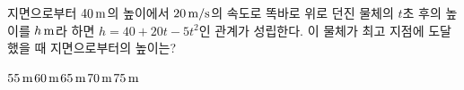 지면으로부터 $40\mkern3mu \mathrm{m}$의 높이에서 $20\mkern3mu \mathrm{m/s}$의 속도로 똑바로 위로 던진 물체의 $t$초 후의 높이를 $h\mkern3mu \mathrm{m}$라 하면 $h=40+20t-5t^2$인 관계가 성립한다. 이 물체가 최고 지점에 도달했을 때 지면으로부터의 높이는?
\begin{choices32}{$55\mkern3mu \mathrm{m}$}{$60\mkern3mu \mathrm{m}$}{$65\mkern3mu \mathrm{m}$}{$70\mkern3mu \mathrm{m}$}{$75\mkern3mu \mathrm{m}$}\end{choices32}
